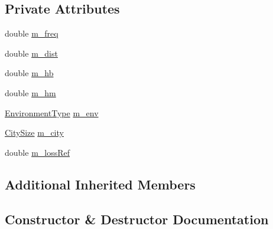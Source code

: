 \subsection*{Private Attributes}
\begin{DoxyCompactItemize}
\item 
double \hyperlink{classItuR1411NlosOverRooftopPropagationLossModelTestCase_a3d08d4b96f3bb1452d93c748e38c1321}{m\+\_\+freq}
\item 
double \hyperlink{classItuR1411NlosOverRooftopPropagationLossModelTestCase_a4556fa0562abd9944fe16e34175acaee}{m\+\_\+dist}
\item 
double \hyperlink{classItuR1411NlosOverRooftopPropagationLossModelTestCase_a20aacca0703f2c2c178fad2cc74e7ba6}{m\+\_\+hb}
\item 
double \hyperlink{classItuR1411NlosOverRooftopPropagationLossModelTestCase_ac5f633470ec30d5f552bfd6ee8a9f9e8}{m\+\_\+hm}
\item 
\hyperlink{group__propagation_ga0e392ed771a28c92112047e63308a53a}{Environment\+Type} \hyperlink{classItuR1411NlosOverRooftopPropagationLossModelTestCase_ae5ca78797b338b4b8805e7557d9f38eb}{m\+\_\+env}
\item 
\hyperlink{group__propagation_ga29c9a1b1a58b6a56054ff5ea4c5a574d}{City\+Size} \hyperlink{classItuR1411NlosOverRooftopPropagationLossModelTestCase_a782e80cfb5e0a52f6bb033b5bc82ba37}{m\+\_\+city}
\item 
double \hyperlink{classItuR1411NlosOverRooftopPropagationLossModelTestCase_a559ade0fb976f4446df2182724ce8d94}{m\+\_\+loss\+Ref}
\end{DoxyCompactItemize}
\subsection*{Additional Inherited Members}


\subsection{Constructor \& Destructor Documentation}
